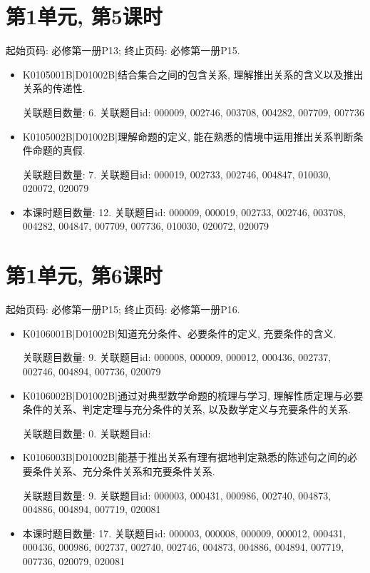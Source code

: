 \section*{第1单元, 第5课时}
起始页码: 必修第一册P13; 终止页码: 必修第一册P15.
\begin{itemize}
\item K0105001B|D01002B|结合集合之间的包含关系, 理解推出关系的含义以及推出关系的传递性.

关联题目数量: 6. 关联题目id: 000009, 002746, 003708, 004282, 007709, 007736

\item K0105002B|D01002B|理解命题的定义, 能在熟悉的情境中运用推出关系判断条件命题的真假.

关联题目数量: 7. 关联题目id: 000019, 002733, 002746, 004847, 010030, 020072, 020079

\item 本课时题目数量: 12. 关联题目id: 000009, 000019, 002733, 002746, 003708, 004282, 004847, 007709, 007736, 010030, 020072, 020079

\end{itemize}

\section*{第1单元, 第6课时}
起始页码: 必修第一册P15; 终止页码: 必修第一册P16.
\begin{itemize}
\item K0106001B|D01002B|知道充分条件、必要条件的定义, 充要条件的含义.

关联题目数量: 9. 关联题目id: 000008, 000009, 000012, 000436, 002737, 002746, 004894, 007736, 020079

\item K0106002B|D01002B|通过对典型数学命题的梳理与学习, 理解性质定理与必要条件的关系、判定定理与充分条件的关系, 以及数学定义与充要条件的关系.

关联题目数量: 0. 关联题目id: 

\item K0106003B|D01002B|能基于推出关系有理有据地判定熟悉的陈述句之间的必要条件关系、充分条件关系和充要条件关系.

关联题目数量: 9. 关联题目id: 000003, 000431, 000986, 002740, 004873, 004886, 004894, 007719, 020081

\item 本课时题目数量: 17. 关联题目id: 000003, 000008, 000009, 000012, 000431, 000436, 000986, 002737, 002740, 002746, 004873, 004886, 004894, 007719, 007736, 020079, 020081

\end{itemize}

